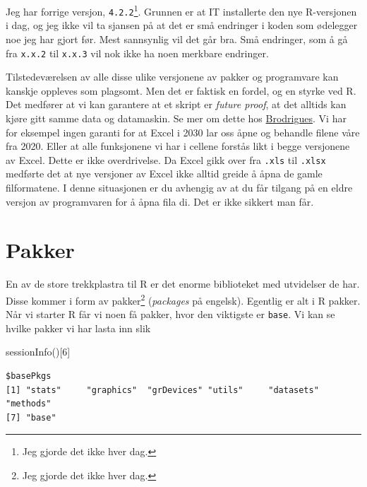 \documentclass[
  letterpaper,
  DIV=11,
  numbers=noendperiod]{scrreprt}
\newenvironment{Shaded}{\begin{snugshade}}{\end{snugshade}}
\newcommand{\DecValTok}[1]{\textcolor[rgb]{0.68,0.00,0.00}{#1}}
\newcommand{\FunctionTok}[1]{\textcolor[rgb]{0.28,0.35,0.67}{#1}}
\newcommand{\NormalTok}[1]{\textcolor[rgb]{0.00,0.23,0.31}{#1}}
\begin{document}
Jeg har forrige versjon, \texttt{4.2.2}\footnote{Jeg gjorde det ikke
  hver dag.}. Grunnen er at IT installerte den nye R-versjonen i dag, og
jeg ikke vil ta sjansen på at det er små endringer i koden som ødelegger
noe jeg har gjort før. Mest sannsynlig vil det går bra. Små endringer,
som å gå fra \texttt{x.x.2} til \texttt{x.x.3} vil nok ikke ha noen
merkbare endringer.

Tilstedeværelsen av alle disse ulike versjonene av pakker og programvare
kan kanskje oppleves som plagsomt. Men det er faktisk en fordel, og en
styrke ved R. Det medfører at vi kan garantere at et skript er
\emph{future proof}, at det alltids kan kjøre gitt samme data og
datamaskin. Se mer om dette hos
\href{https://www.brodrigues.co/blog/2022-11-16-open_source_repro/}{Brodrigues}.
Vi har for eksempel ingen garanti for at Excel i 2030 lar oss åpne og
behandle filene våre fra 2020. Eller at alle funksjonene vi har i
cellene forstås likt i begge versjonene av Excel. Dette er ikke
overdrivelse. Da Excel gikk over fra \texttt{.xls} til \texttt{.xlsx}
medførte det at nye versjoner av Excel ikke alltid greide å åpna de
gamle filformatene. I denne situasjonen er du avhengig av at du får
tilgang på en eldre versjon av programvaren for å åpna fila di. Det er
ikke sikkert man får.


\hypertarget{pakker}{%
\chapter{Pakker}\label{pakker}}

En av de store trekkplastra til R er det enorme biblioteket med
utvidelser de har. Disse kommer i form av pakker\footnote{Jeg gjorde det
  ikke hver dag.} (\emph{packages} på engelsk). Egentlig er alt i R
pakker. Når vi starter R får vi noen få pakker, hvor den viktigste er
\texttt{base}. Vi kan se hvilke pakker vi har lasta inn slik

\begin{Shaded}
\begin{Highlighting}[]
\FunctionTok{sessionInfo}\NormalTok{()[}\DecValTok{6}\NormalTok{]}
\end{Highlighting}
\end{Shaded}

\begin{verbatim}
$basePkgs
[1] "stats"     "graphics"  "grDevices" "utils"     "datasets"  "methods"  
[7] "base"     
\end{verbatim}
\end{document}
